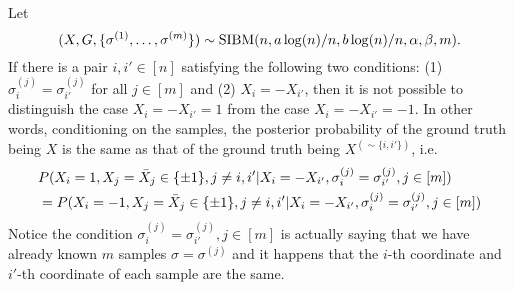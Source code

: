 \documentclass{article}
\begin{document}
\begin{lemma} \label{lm:qq}
	Let 
	$$
	(X,G,\{\sigma^{(1)},\dots,\sigma^{(m)}\})\sim \operatorname{SIBM}(n,a\log(n)/n, b\log(n)/n,\alpha,\beta, m) .
	$$
	If there is a pair $i,i'\in[n]$ satisfying the following two conditions: (1) $\sigma_i^{(j)}=\sigma_{i'}^{(j)}$ for all $j\in[m]$ and (2) $X_i=-X_{i'}$, then it is not possible to distinguish the case $X_i=-X_{i'}=1$ from the case $X_i=-X_{i'}=-1$. In other words, conditioning on the samples, the posterior probability of the ground truth being $X$ is the same as that of the ground truth being $X^{(\sim\{i,i'\})}$, i.e.
	\begin{align}
	&P(X_i=1,X_j = \bar{X}_j \in \{\pm 1\},j \neq i,i' | X_i = -X_{i'}, \sigma_i^{(j)}=\sigma_{i'}^{(j)}, j\in[m]) \notag\\
	&  = P(X_i=-1,X_j = \bar{X}_j \in \{\pm 1\},j \neq i,i' | X_i = -X_{i'}, \sigma_i^{(j)} = \sigma_{i'}^{(j)}, j\in[m])
	\end{align}
	Notice the condition $\sigma_i^{(j)}=\sigma_{i'}^{(j)}, j\in[m]$ is actually saying that we have already known $m$ samples $\sigma = \sigma^{(j)}$ and
	it happens that the $i$-th coordinate and $i'$-th coordinate of each sample are the same. 
\end{lemma}
\end{document}
